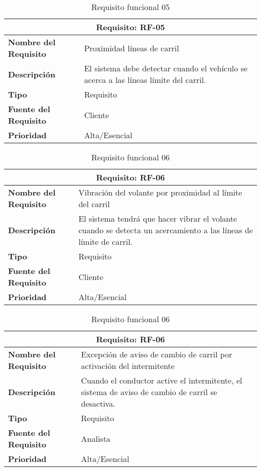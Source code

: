\documentclass[10pt,a4paper,oldfontcommands]{dpds}
\begin{document}
\begin{table}[H]
\begin{center}
\begin{tabular}{p{} p{7cm}}
\multicolumn{2}{c}{\textbf{Requisito: RF-05} } \\
\hline \hline
\textbf{Nombre del Requisito} & Proximidad líneas de carril\\
\textbf{Descripción} & El sistema debe detectar cuando el vehículo se acerca a las líneas límite del carril. \\
\textbf{Tipo} & Requisito  \\
\textbf{Fuente del Requisito} & Cliente  \\
\textbf{Prioridad} & Alta/Esencial  \\ \hline
\end{tabular}
\caption{Requisito funcional 05}
\label{tab:personal}
\end{center}
\end{table}

\begin{table}[H]
\begin{center}
\begin{tabular}{p{} p{7cm}}
\multicolumn{2}{c}{\textbf{Requisito: RF-06} } \\
\hline \hline
\textbf{Nombre del Requisito} &  Vibración del volante por proximidad al límite del carril\\
\textbf{Descripción} & El sistema tendrá que hacer vibrar el volante cuando se detecta un acercamiento a las líneas de límite de carril. \\
\textbf{Tipo} & Requisito  \\
\textbf{Fuente del Requisito} & Cliente  \\
\textbf{Prioridad} & Alta/Esencial  \\ \hline
\end{tabular}
\caption{Requisito funcional 06}
\label{tab:RF-06}
\end{center}
\end{table}

\begin{table}[H]
\begin{center}
\begin{tabular}{p{} p{7cm}}
\multicolumn{2}{c}{\textbf{Requisito: RF-06} } \\
\hline \hline
\textbf{Nombre del Requisito} &  Excepción de aviso de cambio de carril por activación del intermitente\\
\textbf{Descripción} & Cuando el conductor active el intermitente, el sistema de aviso de cambio de carril se desactiva. \\
\textbf{Tipo} & Requisito  \\
\textbf{Fuente del Requisito} & Analista  \\
\textbf{Prioridad} & Alta/Esencial  \\ \hline
\end{tabular}
\caption{Requisito funcional 06}
\label{tab:RF-06}
\end{center}
\end{table}
\end{document}
